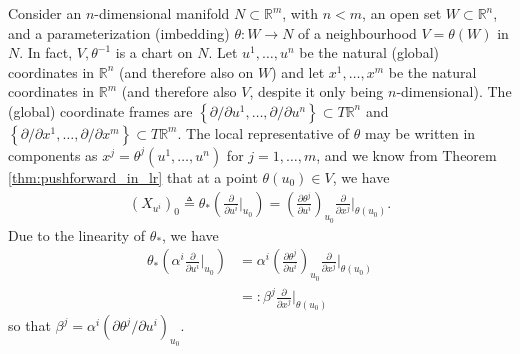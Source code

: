 \documentclass[psamsfonts]{amsart}
\theoremstyle{definition}
\theoremstyle{remark}
\newcommand*\R{\mathds{R}}
\numberwithin{equation}{section}
\begin{document}
Consider an $n$-dimensional manifold $N\subset \R^m$, with $n<m$, an open set $W\subset \R^n$, and a parameterization (imbedding) $\theta: W\rightarrow N$ of a neighbourhood $V = \theta(W)$ in $N$. In fact, $V, \theta^{-1}$ is a chart on $N$. Let $u^1, \dots, u^n$ be the natural (global) coordinates in $\R^n$ (and therefore also on $W$) and let $x^1, \dots, x^m$ be the natural coordinates in $\R^m$ (and therefore also $V$, despite it only being $n$-dimensional). The (global) coordinate frames are $\left\{\partial / \partial u^1, \dots, \partial / \partial u^n\right\} \subset T\R^n $ and $\left\{\partial / \partial x^1, \dots, \partial / \partial x^m\right\} \subset T\R^m$. 
The local representative of $\theta$ may be written in components as $x^j = \theta^j(u^1, \dots, u^n)$ for $j = 1, \dots, m$, and we know from Theorem \ref{thm:pushforward_in_lr} that at a point $\theta(u_0)\in V$, we have
\begin{equation}\begin{aligned}\label{eq:parameterized_tangent_vec}
 \left(X_{u^i}\right)_0 \triangleq \theta_*\left( \frac{\partial}{\partial u^i}\biggr|_{u_0}\right) = \left(\frac{\partial \theta^j}{\partial u^i}\right)_{u_0} \frac{\partial}{\partial {x^{j}}}\biggr|_{\theta(u_0)}.
 \end{aligned}\end{equation}
Due to the linearity of $\theta_*$, we have %
\begin{equation}\begin{aligned}
\theta_* \left(\alpha^i \frac{\partial}{\partial u^i}\biggr|_{u_0}\right) &={} \alpha^i \left(\frac{\partial \theta^j}{\partial u^i}\right)_{u_0} \frac{\partial}{\partial {x^{j}}}\biggr|_{\theta(u_0)}\\
&=: \beta^j \frac{\partial}{\partial {x^{j}}}\biggr|_{\theta(u_0)}
\end{aligned}\end{equation}
so that $\beta^j = \alpha^i \left({\partial \theta^j}/{\partial u^i}\right)_{u_0}$. 
\end{document}
